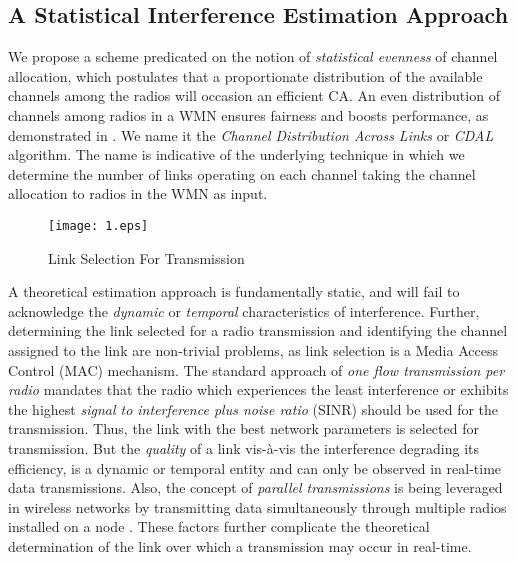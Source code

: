 \documentclass[conference]{IEEEtran}
\begin{document}
\subsection{A Statistical Interference Estimation Approach}
 We propose a scheme predicated on the notion of \textit{statistical evenness} of channel allocation, which postulates that a proportionate distribution of the available channels among the radios will occasion an efficient CA. An even distribution of channels among radios in a WMN ensures fairness and boosts performance, as demonstrated in \cite{Manas2}. We name it the \textit{Channel Distribution Across Links} or \textit{CDAL} algorithm. The name is indicative of the underlying technique in which we determine the number of links operating on each channel taking the channel allocation to radios in the WMN as input.
 \begin{figure}[htb!]
                \centering 
                \texttt{[image: 1.eps]}
                \caption{Link Selection For Transmission}
                \label{links}
        \end{figure}

A theoretical estimation approach is fundamentally static, and will fail to acknowledge the \textit{dynamic} or \textit{temporal} characteristics of interference. Further, determining the link selected for a radio transmission and identifying the channel assigned to the link are non-trivial problems, as link selection is a Media Access Control (MAC) mechanism. The standard approach of \textit{one flow transmission per radio} mandates that the radio which experiences the least interference or exhibits the highest \textit{signal to interference plus noise ratio} (SINR) should be used for the transmission. Thus, the link with the best network parameters is selected for transmission. But the \textit{quality} of a link vis-\`{a}-vis the interference degrading its efficiency, is a dynamic or temporal entity and can only be observed in real-time data transmissions. Also, the concept of \textit{parallel transmissions} is being leveraged in wireless networks by transmitting data simultaneously through 
multiple radios installed on a node \cite{Parallel}. These factors further complicate the theoretical determination of the link over which a transmission may occur in real-time.
\end{document}
